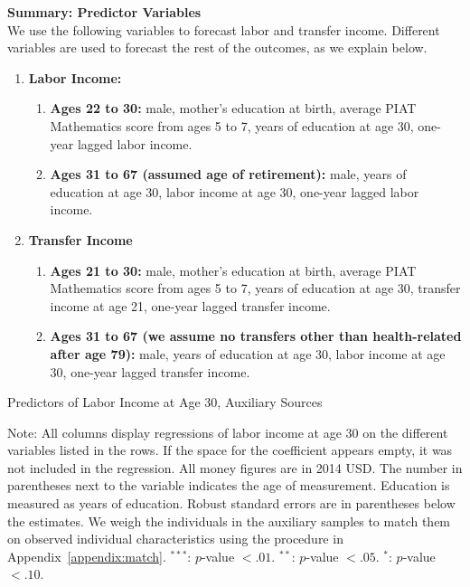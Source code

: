 \noindent \textbf{Summary: Predictor Variables}\\
\noindent We use the following variables to forecast labor and transfer income. Different variables are used to forecast the rest of the outcomes, as we explain below.
\begin{enumerate}
\item \textbf{Labor Income:}
\begin{enumerate}
\item \textbf{Ages 22 to 30:} male, mother's education at birth, average PIAT Mathematics score from ages 5 to 7, years of education at age 30, one-year lagged labor income.
\item \textbf{Ages 31 to 67 (assumed age of retirement):} male, years of education at age 30, labor income at age 30, one-year lagged labor income.
\end{enumerate}
\item \textbf{Transfer Income}
\begin{enumerate}
\item \textbf{Ages 21 to 30:} male, mother's education at birth, average PIAT Mathematics score from ages 5 to 7, years of education at age 30, transfer income at age 21, one-year lagged transfer income.
\item \textbf{Ages 31 to 67 (we assume no transfers other than health-related after age 79):} male, years of education at age 30, labor income at age 30, one-year lagged transfer income.
\end{enumerate}
\end{enumerate}

\begin{table}
\begin{threeparttable}
\caption{Predictors of Labor Income at Age 30, Auxiliary Sources}
\label{table:predlaborincome}
\centering
\footnotesize

\begin{tablenotes}
\footnotesize
\item Note: All columns display regressions of labor income at age 30 on the different variables listed in the rows. If the space for the coefficient appears empty, it was not included in the regression. All money figures are in 2014 USD. The number in parentheses next to the variable indicates the age of measurement. Education is measured as years of education. Robust standard errors are in parentheses below the estimates. We weigh the individuals in the auxiliary samples to match them on observed individual characteristics using the procedure in Appendix~\ref{appendix:match}. $^{***}$: $p$-value $< .01$. $^{**}$: $p$-value $< .05$. $^{*}$: $p$-value $< .10$.
\end{tablenotes}
\end{threeparttable}
\end{table}

